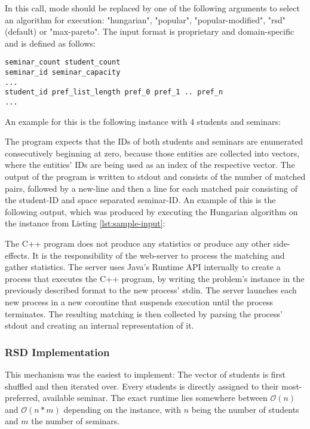 In this call, mode should be replaced by one of the following arguments to select an algorithm for execution: "hungarian", "popular", "popular-modified", "rsd" (default) or "max-pareto". The input format is proprietary and domain-specific and is defined as follows:
\begin{lstlisting}[frame=single, caption={Program input format},captionpos=b]
seminar_count student_count
seminar_id seminar_capacity
...
student_id pref_list_length pref_0 pref_1 .. pref_n
...
\end{lstlisting}

An example for this is the following instance with 4 students and seminars:


The program expects that the IDs of both students and seminars are enumerated consecutively beginning at zero, because those entities are collected into vectors, where the entities' IDs are being used as an index of the respective vector. The output of the program is written to stdout and consists of the number of matched pairs, followed by a new-line and then a line for each matched pair consisting of the student-ID and space separated seminar-ID. An example of this is the following output, which was produced by executing the Hungarian algorithm on the instance from Listing \ref{lst:sample-input}:


The C++ program does not produce any statistics or produce any other side-effects. It is the responsibility of the web-server to process the matching and gather statistics. The server uses Java's Runtime API internally to create a process that executes the C++ program, by writing the problem's instance in the previously described format to the new process' stdin. The server launches each new process in a new coroutine that suspends execution until the process terminates. The resulting matching is then collected by parsing the process' stdout and creating an internal representation of it. 

\subsubsection{RSD Implementation}
This mechanism was the easiest to implement: The vector of students is first shuffled and then iterated over. Every students is directly assigned to their most-preferred, available seminar. The exact runtime lies somewhere between $\mathcal{O}(n)$ and $\mathcal{O}(n * m)$ depending on the instance, with $n$ being the number of students and $m$ the number of seminars.


